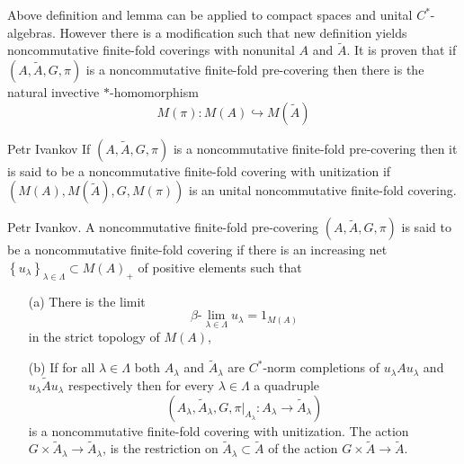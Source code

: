 \documentclass{beamer}
\theoremstyle{plain}
\newcommand{\hookto}{\hookrightarrow}        %
\begin{document}
\begin{frame}
	
	Above definition and lemma can be applied to compact spaces and unital $C^*$-algebras. However there is a modification such that new definition yields noncommutative finite-fold coverings with nonunital $A$ and $\widetilde{A}$. It is proven that if $\left(A, \widetilde{A}, G, \pi \right)$ is a noncommutative finite-fold  pre-covering  then there is the natural invective $*$-homomorphism
	$$
	M\left( \pi\right): M\left( A\right)  \hookto M\left(\widetilde A \right) 
	$$
	
	\begin{definition}\label{fin_comp_defn}\alert{Petr  Ivankov}
		If $\left(A, \widetilde{A}, G, \pi \right)$ is a noncommutative finite-fold  pre-covering then it is said to be 	a \alert{noncommutative finite-fold covering with unitization} if 
		$\left(	M\left( A\right) , 	M\left( \widetilde{A}\right) , G, 	M\left( \pi\right)  \right)$ is an unital {noncommutative finite-fold covering}.
		
			\end{definition}
\end{frame}
\begin{frame}
	\begin{definition}
		\alert{Petr Ivankov}.	A   noncommutative finite-fold  pre-covering $\left(A, \widetilde{A}, G, \pi \right)$ is said to be  a \alert{noncommutative finite-fold covering} if there is an increasing net $\left\{u_\lambda\right\}_{\lambda\in\Lambda}\subset M\left( A\right)_+ $  of positive elements such that
		\begin{enumerate}
			\item[(a)] There is the limit 
			$$
			\beta\text{-}\lim_{\lambda \in \Lambda} u_\lambda = 1_{M\left(A \right) }
			$$
			in the strict topology of $M\left(A \right)$,
			\item[(b)]  If for all   $\lambda\in\Lambda$ both $A_\lambda$ and  $\widetilde A_\lambda$ are $C^*$-norm completions  of $u_\lambda A u_\lambda$ and  $u_\lambda\widetilde{A}u_\lambda$ respectively then for every $\lambda\in\Lambda$ a quadruple
			$$
			\left(A_\lambda, \widetilde{A}_\lambda, G, \left.\pi\right|_{A_\lambda} :A_\lambda\to \widetilde{A}_\lambda\right)	
			$$
			is a noncommutative finite-fold covering with unitization. The action 	$G \times \widetilde{A}_\lambda\to \widetilde{A}_\lambda$, is the restriction on $\widetilde{A}_\lambda\subset \widetilde{   A}$ of the action $G\times  \widetilde{A}\to \widetilde{A}$.
		\end{enumerate}
		
	\end{definition}
\end{frame}
\end{document}
